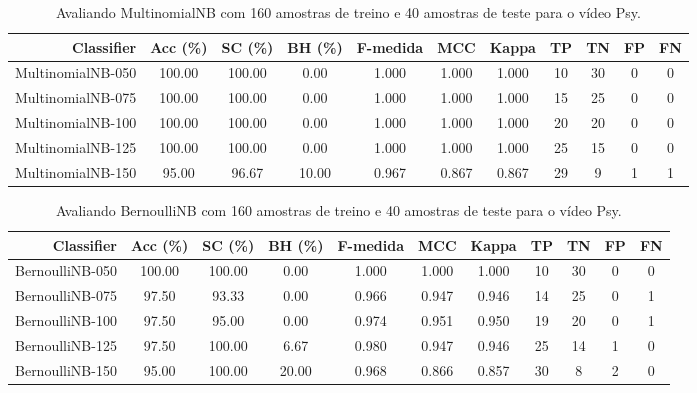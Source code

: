 \begin{table}[!htb]
\centering
\caption{Avaliando MultinomialNB com 160 amostras de treino e 40 amostras de teste para o vídeo Psy.}
\label{tab:multinomial-nb-Psy}
\begin{tabular}{r|c|c|c|c|c|c|c|c|c|c}
\hline\hline
Classifier & Acc (\%) & SC (\%) & BH (\%) & F-medida & MCC & Kappa & TP & TN & FP & FN \\ \hline
MultinomialNB-050 & 100.00 & 100.00 & 0.00 & 1.000 & 1.000 & 1.000 & 10 & 30 & 0 & 0 \\ 
MultinomialNB-075 & 100.00 & 100.00 & 0.00 & 1.000 & 1.000 & 1.000 & 15 & 25 & 0 & 0 \\ 
MultinomialNB-100 & 100.00 & 100.00 & 0.00 & 1.000 & 1.000 & 1.000 & 20 & 20 & 0 & 0 \\ 
MultinomialNB-125 & 100.00 & 100.00 & 0.00 & 1.000 & 1.000 & 1.000 & 25 & 15 & 0 & 0 \\ 
MultinomialNB-150 & 95.00 & 96.67 & 10.00 & 0.967 & 0.867 & 0.867 & 29 & 9 & 1 & 1 \\ 
\hline\hline
\end{tabular}
\end{table}
\begin{table}[!htb]
\centering
\caption{Avaliando BernoulliNB com 160 amostras de treino e 40 amostras de teste para o vídeo Psy.}
\label{tab:bernoulli-nb-Psy}
\begin{tabular}{r|c|c|c|c|c|c|c|c|c|c}
\hline\hline
Classifier & Acc (\%) & SC (\%) & BH (\%) & F-medida & MCC & Kappa & TP & TN & FP & FN \\ \hline
BernoulliNB-050 & 100.00 & 100.00 & 0.00 & 1.000 & 1.000 & 1.000 & 10 & 30 & 0 & 0 \\ 
BernoulliNB-075 & 97.50 & 93.33 & 0.00 & 0.966 & 0.947 & 0.946 & 14 & 25 & 0 & 1 \\ 
BernoulliNB-100 & 97.50 & 95.00 & 0.00 & 0.974 & 0.951 & 0.950 & 19 & 20 & 0 & 1 \\ 
BernoulliNB-125 & 97.50 & 100.00 & 6.67 & 0.980 & 0.947 & 0.946 & 25 & 14 & 1 & 0 \\ 
BernoulliNB-150 & 95.00 & 100.00 & 20.00 & 0.968 & 0.866 & 0.857 & 30 & 8 & 2 & 0 \\ 
\hline\hline
\end{tabular}
\end{table}
